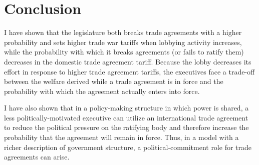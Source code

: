 \documentclass[10pt]{article}
\begin{document}

\section{Conclusion}
\label{sec:concl}
I have shown that the legislature both breaks trade agreements with a higher probability and sets higher trade war tariffs when lobbying activity increases, while the probability with which it breaks agreements (or fails to ratify them) decreases in the domestic trade agreement tariff. Because the lobby decreases its effort in response to higher trade agreement tariffs, the executives face a trade-off between the welfare derived while a trade agreement is in force and the probability with which the agreement actually enters into force.

I have also shown that in a policy-making structure in which power is shared, a less politically-motivated executive can utilize an international trade agreement to reduce the political pressure on the ratifying body and therefore increase the probability that the agreement will remain in force. Thus, in a model with a richer description of government structure, a political-commitment role for trade agreements can arise.
\end{document}
